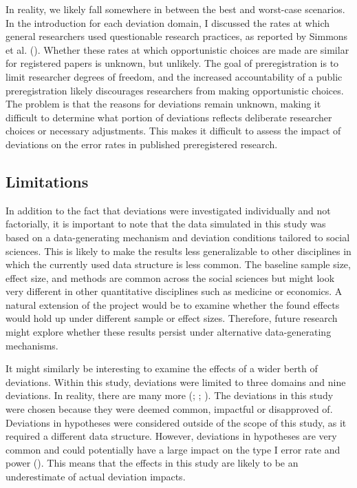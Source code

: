 \documentclass[
  man,
  floatsintext,
  longtable,
  nolmodern,
  notxfonts,
  notimes,
  colorlinks=true,linkcolor=blue,citecolor=blue,urlcolor=blue]{apa7}
\begin{document}
In reality, we likely fall somewhere in between the best and worst-case
scenarios. In the introduction for each deviation domain, I discussed
the rates at which general researchers used questionable research
practices, as reported by Simmons et al.
(). Whether these rates at which
opportunistic choices are made are similar for registered papers is
unknown, but unlikely. The goal of preregistration is to limit
researcher degrees of freedom, and the increased accountability of a
public preregistration likely discourages researchers from making
opportunistic choices. The problem is that the reasons for deviations
remain unknown, making it difficult to determine what portion of
deviations reflects deliberate researcher choices or necessary
adjustments. This makes it difficult to assess the impact of deviations
on the error rates in published preregistered research.

\subsection{Limitations}\label{limitations}

In addition to the fact that deviations were investigated individually
and not factorially, it is important to note that the data simulated in
this study was based on a data-generating mechanism and deviation
conditions tailored to social sciences. This is likely to make the
results less generalizable to other disciplines in which the currently
used data structure is less common. The baseline sample size, effect
size, and methods are common across the social sciences but might look
very different in other quantitative disciplines such as medicine or
economics. A natural extension of the project would be to examine
whether the found effects would hold up under different sample or effect
sizes. Therefore, future research might explore whether these results
persist under alternative data-generating mechanisms.

It might similarly be interesting to examine the effects of a wider
berth of deviations. Within this study, deviations were limited to three
domains and nine deviations. In reality, there are many more
(;
;
).
The deviations in this study were chosen because they were deemed
common, impactful or disapproved of. Deviations in hypotheses were
considered outside of the scope of this study, as it required a
different data structure. However, deviations in hypotheses are very
common and could potentially have a large impact on the type I error
rate and power (). This means that the effects in this study are likely to be an
underestimate of actual deviation impacts.
\end{document}
